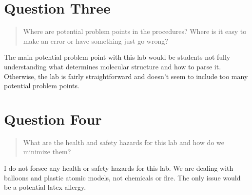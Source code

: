 \documentclass[11pt, letterpaper]{article}
\begin{document}
\section{Question Three}
\begin{quote}
    Where are potential problem points in the procedures? Where is it easy to make an error 
    or have something just go wrong?
\end{quote}

The main potential problem point with this lab would be students not fully understanding 
what determines molecular structure and how to parse it. 
Otherwise, the lab is fairly straightforward and doesn't seem to include too many
potential problem points.

\section{Question Four}
\begin{quote}
    What are the health and safety hazards for this lab and how do we minimize them?
\end{quote}

I do not forsee any health or safety hazards for this lab. 
We are dealing with balloons and plastic atomic models, not chemicals or fire.
The only issue would be a potential latex allergy.
\end{document}
